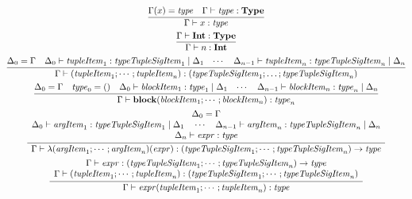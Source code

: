 \begin{gather*}
  \infer{\Gamma \vdash x: \mathit{type}}{
    \Gamma(x) = \mathit{type}
    &
    \Gamma \vdash \mathit{type}: \mathbf{Type}
  }
  \\
  \infer{\Gamma \vdash n: \mathbf{Int}}{
    \Gamma \vdash \mathbf{Int}: \mathbf{Type}
  }
  \\
  \infer{\Gamma \vdash (\mathit{tupleItem}_1; \cdots; \mathit{tupleItem}_n): (\mathit{typeTupleSigItem}_1; \ldots; \mathit{typeTupleSigItem}_n)}{
    \Delta_0 = \Gamma
    &
    \Delta_0 \vdash \mathit{tupleItem}_1: \mathit{typeTupleSigItem}_1 \mid \Delta_1
    &
    \cdots
    &
    \Delta_{n - 1} \vdash \mathit{tupleItem}_n: \mathit{typeTupleSigItem}_n \mid \Delta_n
  }
  \\
  \infer{\Gamma \vdash \mathbf{block}(\mathit{blockItem}_1; \cdots; \mathit{blockItem}_n): \mathit{type}_n}{
    \Delta_0 = \Gamma
    &
    \mathit{type}_0 = ()
    &
    \Delta_0 \vdash \mathit{blockItem}_1: \mathit{type}_1 \mid \Delta_1
    &
    \cdots
    &
    \Delta_{n - 1} \vdash \mathit{blockItem}_n: \mathit{type}_n \mid \Delta_n
  }
  \\
  \infer{\Gamma \vdash \lambda(\mathit{argItem}_1; \cdots; \mathit{argItem}_n)(\mathit{expr}): (\mathit{typeTupleSigItem}_1; \cdots; \mathit{typeTupleSigItem}_n) \rightarrow \mathit{type}}{
    \begin{array}{c}
      \Delta_0 = \Gamma
      \\
      \Delta_0 \vdash \mathit{argItem}_1: \mathit{typeTupleSigItem}_1 \mid \Delta_1
      \hspace{1em}
      \cdots
      \hspace{1em}
      \Delta_{n - 1} \vdash \mathit{argItem}_n: \mathit{typeTupleSigItem}_n \mid \Delta_n
      \\
      \Delta_n \vdash \mathit{expr}: \mathit{type}
    \end{array}
  }
  \\
  \infer{\Gamma \vdash \mathit{expr}(\mathit{tupleItem}_1; \cdots; \mathit{tupleItem}_n): \mathit{type}}{
    \begin{array}{c}
      \Gamma \vdash \mathit{expr}: (\mathit{typeTupleSigItem}_1; \cdots; \mathit{typeTupleSigItem}_n) \rightarrow \mathit{type}
      \\
      \Gamma \vdash (\mathit{tupleItem}_1; \cdots; \mathit{tupleItem}_n): (\mathit{typeTupleSigItem}_1; \cdots; \mathit{typeTupleSigItem}_n)
    \end{array}
  }
  \\

\end{gather*}
